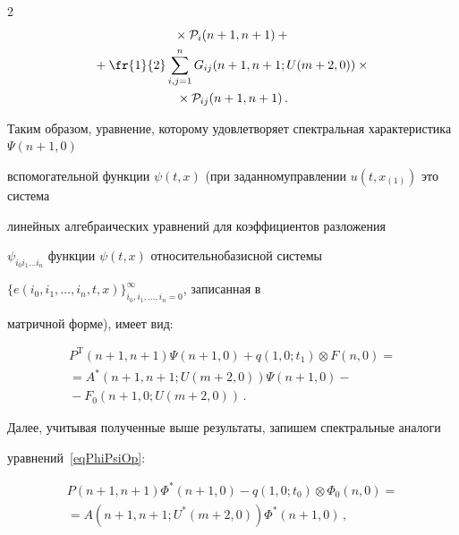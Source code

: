 \begin{multicols}{2}
\begin{multline}
{}\times \mathcal{P}_i(n+1,n+1) + {}\\


{}  + \fr{1}{2} \sum\limits_{i,j = 1}^n G_{ij}(n+1,n+1; U(m+2,0)) \times{}\\


{}\times \mathcal{P}_{ij}(n+1,n+1)\,.


\end{multline}





Таким образом, уравнение, которому удовлетворяет спектральная характеристика ${\Psi(n+1,0)}$ 


вспомогательной функции $\psi(t,x)$ (при заданном\linebreak управлении ${u(t,x_{(1)})}$ это сис\-те\-ма 


линейных ал\-гебраических уравнений для коэффициентов раз\-ло\-жения 


$\psi_{i_0 i_1 \dots i_n}$ функции $\psi(t,x)$ относительно\linebreak базисной сис\-те\-мы 


${\{e(i_0,i_1,\dots,i_n,t,x)\}_{i_0,i_1,\dots,i_n = 0}^\infty}$, записанная в 


матричной форме), имеет вид:


\begin{multline*}


  P^\mathrm{T}(n+1,n+1) \Psi(n+1,0) + q(1,0;t_1) \otimes F(n,0) ={} \\


{}=  A^*(n+1,n+1; U(m+2,0)) \Psi(n+1,0) -{}\\


{}- F_0(n+1,0; U(m+2,0))\,.


\end{multline*}





Далее, учитывая полученные выше результаты, запишем спектральные аналоги 


уравнений~\eqref{eqPhiPsiOp}:


\begin{multline}


\label{eqOHFA}


  P(n+1,n+1) \Phi^*(n+1,0) - q(1,0;t_0) \otimes \Phi_0(n,0) = {}\\


{}  = A(n+1,n+1; U^*(m+2,0)) \Phi^*(n+1,0)\,,


\end{multline}






\end{multicols}
